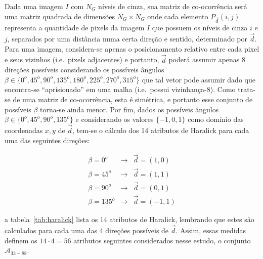 Dada uma imagem $I$ com $N_G$ níveis de cinza, sua matriz de co-ocorrência será
uma matriz quadrada de dimensões $N_G \times N_G$ onde cada elemento $P_{\vec{d}}(i,j)$ representa
a quantidade de pixels da imagem $I$ que possuem os níveis de cinza $i$ e $j$,
separados por uma distância numa certa direção e sentido, determinado por
$\vec{d}$. Para uma imagem, considera-se apenas o posicionamento relativo entre
cada pixel e seus vizinhos (i.e.\ pixels adjacentes) e portanto, $\vec{d}$
poderá assumir apenas 8 direções possíveis considerando os possíveis ângulos
$\beta \in \{0^o, 45^o, 90^o, 135^o, 180^o, 225^o, 270^o, 315^o\}$ que tal
vetor pode assumir dado que encontra-se ``aprisionado'' em uma malha
(i.e.\ possui vizinhança-8). Como
trata-se de uma matriz de co-ocorrência, esta é simétrica, e portanto esse
conjunto de possíveis $\beta$ torna-se ainda menor. Por fim, dados os possíveis
ângulos $\beta \in \{0^o, 45^o, 90^o, 135^o\}$ e considerando os valores $\{-1,
0, 1\}$ como domínio das coordenadas $x,y$ de $\vec{d}$, tem-se o cálculo dos 14
atributos de Haralick para cada uma das seguintes direções:

\begin{eqnarray}
  \beta = 0^o & \to & \vec{d} = (1, 0) \\
  \beta = 45^o & \to & \vec{d} = (1, 1) \\
  \beta = 90^o & \to & \vec{d} = (0, 1) \\
  \beta = 135^o & \to & \vec{d} = (-1, 1)
\end{eqnarray}

\noindent a tabela~\ref{tab:haralick} lista os 14 atributos de Haralick,
lembrando que estes são calculados para cada uma das 4 direções possíveis de
$\vec{d}$. Assim, essas medidas definem os $14 \cdot 4 = 56$ atributos seguintes
considerados nesse estudo, o conjunto $\mathcal{A}_{33-88}$.

